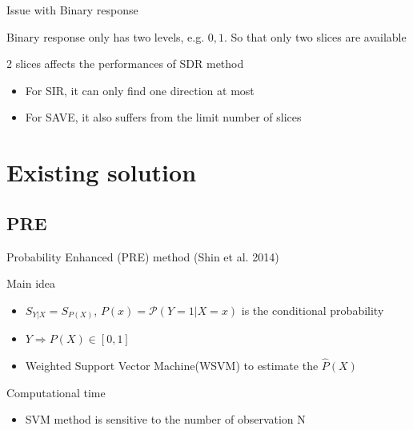 \documentclass[ignorenonframetext,]{beamer}
\providecommand{\tightlist}{%
  \setlength{\itemsep}{0pt}\setlength{\parskip}{0pt}}
\begin{document}
\begin{frame}{Issue with Binary response}

Binary response only has two levels, e.g. \(0,1\). So that only two
slices are available

\begin{block}{2 slices affects the performances of SDR method}

\begin{itemize}
\tightlist
\item
  For SIR, it can only find one direction at most\\
\item
  For SAVE, it also suffers from the limit number of slices
\end{itemize}

\end{block}

\end{frame}

\section{Existing solution}\label{existing-solution}

\subsection{PRE}\label{pre}

\begin{frame}{Probability Enhanced (PRE) method (Shin et al. 2014)}

\begin{block}{Main idea}

\begin{itemize}
\tightlist
\item
  \(S_{Y|X} = S_{P(X)}\), \(P(x) = \mathcal{P}(Y = 1|X = x)\) is the
  conditional probability
\item
  \(Y \Rightarrow P(X) \in [0,1]\)
\item
  Weighted Support Vector Machine(WSVM) to estimate the \(\hat{P}(X)\)
\end{itemize}

\end{block}

\begin{block}{Computational time}

\begin{itemize}
\tightlist
\item
  SVM method is sensitive to the number of observation N
\end{itemize}

\end{block}

\end{frame}
\end{document}
